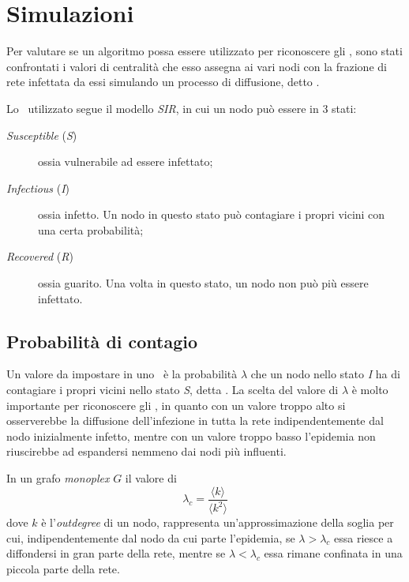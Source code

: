 \chapter{Simulazioni}

Per valutare se un algoritmo possa essere utilizzato per riconoscere gli \infsp, 
sono stati confrontati i valori di centralità che esso assegna ai vari nodi con la frazione di 
rete infettata da essi simulando un processo di diffusione, detto \spproc.

Lo \spproc\ utilizzato segue il modello \textit{SIR}, in cui un nodo può essere in 3 stati:
\begin{description}
    \item[\textit{Susceptible} (\textit{S})] ossia vulnerabile ad essere infettato;
    \item[\textit{Infectious} (\textit{I})] ossia infetto. Un nodo in questo stato può contagiare
        i propri vicini con una certa probabilità;
    \item[\textit{Recovered} (\textit{R})] ossia guarito. Una volta in questo stato, un nodo non può più essere
        infettato.
\end{description}

\section{Probabilità di contagio}
Un valore da impostare in uno \spproc\ è la probabilità $\lambda$ che un nodo nello stato \textit{I}
ha di contagiare i propri vicini nello stato \textit{S}, detta \epprob.
La scelta del valore di $\lambda$ è molto importante per riconoscere gli \infsp, 
in quanto con un valore troppo alto si osserverebbe la diffusione dell'infezione in tutta la 
rete indipendentemente dal nodo inizialmente infetto, mentre con un valore troppo basso l'epidemia 
non riuscirebbe ad espandersi nemmeno dai nodi più influenti. 

In un grafo \textit{monoplex} $G$ il valore di \crepp\
\begin{equation}
    \lambda_c = \frac{\langle k  \rangle}{\langle k^2 \rangle}
\end{equation}
dove $k$ è l'\textit{outdegree} di un nodo, rappresenta un'approssimazione della soglia per 
cui, indipendentemente dal nodo da cui parte l'epidemia, se $\lambda > \lambda_c$ essa riesce 
a diffondersi in gran parte della rete, mentre se $\lambda < \lambda_c$ essa rimane confinata 
in una piccola parte della rete\cite{saumell:epidemicsp}.

